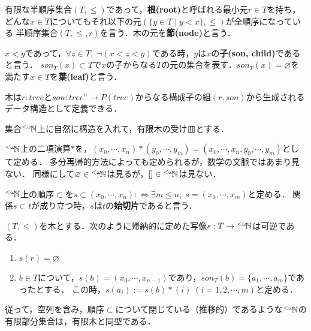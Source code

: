 \documentclass[uplatex, 12pt, dvipdfmx]{jsreport}
\begin{document}
\begin{definition}
    有限な半順序集合$(T,\le)$であって，\textbf{根(root)}と呼ばれる最小元$r\in T$を持ち，
    どんな$x\in T$についてもそれ以下の元$(\{y\in T\mid y<x\},\le)$が全順序になっている
    半順序集合$(T,\le,r)$を言う．木の元を\textbf{節(node)}と言う．

    $x<y$であって，$\forall z\in T,\; \lnot(x<z<y)$である時，$y$は$x$の\textbf{子(son, child)}であると言う．
    $son_T(x)\subset T$で$x$の子からなる$T$の元の集合を表す．$son_T(x)=\varnothing$を満たす$x\in T$を\textbf{葉(leaf)}と言う．
\end{definition}
\begin{remark}
    木は$r:tree$と$son:tree^n\to P(tree)$からなる構成子の組$(r,son)$から生成されるデータ構造として定義できる．
\end{remark}

集合${}^{<\omega}\!\mathbb{N}$上に自然に構造を入れて，有限木の受け皿とする．

\begin{definition}[concatenation]
    ${}^{<\omega}\!\mathbb{N}$上の二項演算$*$を，$(x_0,\cdots,x_n)*(y_0,\cdots,y_m)=(x_0,\cdots,x_n,y_0,\cdots,y_m)$として定める．
    多分再帰的方法によっても定められるが，数学の文脈ではあまり見ない．
    同様にして$\varnothing\in{}^{<\omega}\!\mathbb{N}$は見るが，$[]\in{}^{<\omega}\!\mathbb{N}$は見ない．
\end{definition}

\begin{definition}
    ${}^{<\omega}\!\mathbb{N}$上の順序$\subset$を$s\subset (x_0,\cdots,x_{n}):\Leftrightarrow\exists m\le n,\; s=(x_0,\cdots,x_m)$と定める．
    関係$s\subset t$が成り立つ時，$s$は$t$の\textbf{始切片}であると言う．
\end{definition}

\begin{proposition}[有限木の自然数の有限列による表現]
    $(T,\le)$を木とする．次のように帰納的に定めた写像$s:T\to{}^{<\omega}\!\mathbb{N}$は可逆である．
    \begin{enumerate}
        \item $s(r)=\varnothing$
        \item $b\in T$について，$s(b)=(x_0,\cdots,x_{n-1})$であり，$son_T(b)=\{a_1,\cdots,a_m\}$であったとする．
        この時，$s(a_i):=s(b)*(i)\;(i=1,2,\cdots,m)$と定める．
    \end{enumerate}
\end{proposition}
\begin{remark}
    従って，空列を含み，順序$\subset$について閉じている（推移的）であるような${}^{<\omega}\!\mathbb{N}$の有限部分集合は，有限木と同型である．
\end{remark}
\end{document}
